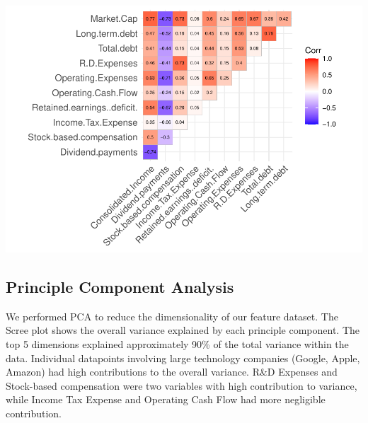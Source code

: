 \documentclass[11pt,]{article}
\begin{document}
\begin{center}\includegraphics{stock_analysis_files/figure-latex/correlation plot 2-1} \end{center}

\hypertarget{principle-component-analysis-1}{%
\subsection{Principle Component
Analysis}\label{principle-component-analysis-1}}

We performed PCA to reduce the dimensionality of our feature dataset.
The Scree plot shows the overall variance explained by each principle
component. The top 5 dimensions explained approximately 90\% of the
total variance within the data. Individual datapoints involving large
technology companies (Google, Apple, Amazon) had high contributions to
the overall variance. R\&D Expenses and Stock-based compensation were
two variables with high contribution to variance, while Income Tax
Expense and Operating Cash Flow had more negligible contribution.
\end{document}
